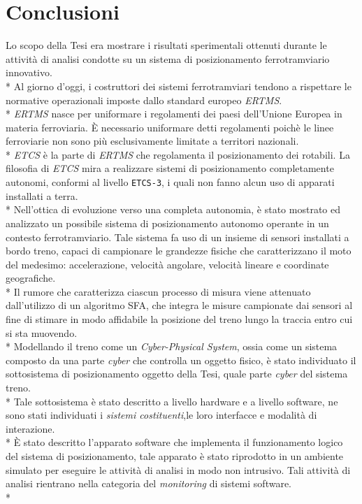 \chapter{Conclusioni}
Lo scopo della Tesi era mostrare i risultati sperimentali ottenuti durante le attivit\`a di analisi condotte su un sistema di posizionamento ferrotramviario innovativo.\\*
Al giorno d'oggi, i costruttori dei sistemi ferrotramviari tendono a rispettare le normative operazionali imposte dallo standard europeo \emph{ERTMS}.\\*
\emph{ERTMS} nasce per uniformare i regolamenti dei paesi dell'Unione Europea in materia ferroviaria. \`E necessario uniformare detti regolamenti poich\`e le linee ferroviarie non sono pi\`u esclusivamente limitate a territori nazionali.\\*
\emph{ETCS} \`e la parte di \emph{ERTMS} che regolamenta il posizionamento dei rotabili. La filosofia di \emph{ETCS} mira a realizzare sistemi di posizionamento completamente autonomi, conformi al livello \texttt{ETCS-3}, i quali non fanno alcun uso di apparati installati a terra.\\*
Nell'ottica di evoluzione verso una completa autonomia, \`e stato mostrato ed analizzato un possibile sistema di posizionamento autonomo operante in un contesto ferrotramviario. Tale sistema fa uso di un insieme di sensori installati a bordo treno, capaci di campionare le grandezze fisiche che caratterizzano il moto del medesimo: accelerazione, velocit\`a angolare, velocit\`a lineare e coordinate geografiche.\\*
Il rumore che caratterizza ciascun processo di misura viene attenuato dall'utilizzo di un algoritmo SFA, che integra le misure campionate dai sensori al fine di stimare in modo affidabile la posizione del treno lungo la traccia entro cui si sta muovendo.\\*
Modellando il treno come un \emph{Cyber-Physical System}, ossia come un sistema composto da una parte \emph{cyber} che controlla un oggetto fisico, \`e stato individuato il sottosistema di posizionamento oggetto della Tesi, quale parte \emph{cyber} del sistema treno.\\*
Tale sottosistema \`e stato descritto a livello hardware e a livello software, ne sono stati individuati i \emph{sistemi costituenti},le loro interfacce e modalit\`a di interazione.\\*
\`E stato descritto l'apparato software che implementa il funzionamento logico del sistema di posizionamento, tale apparato \`e stato riprodotto in un ambiente simulato per eseguire le attivit\`a di analisi in modo non intrusivo. Tali attivit\`a di analisi rientrano nella categoria del \emph{monitoring} di sistemi software.\\*
